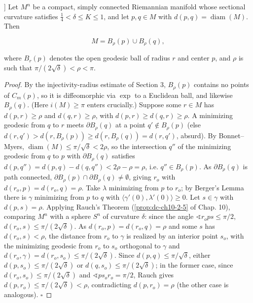 \begin{lemma}[covering by two balls; Tsukamoto [Ts]]
  \label{lem:dc-ch13-4-2}
  Let $M^n$ be a compact, simply connected Riemannian manifold whose sectional
  curvature satisfies $\tfrac14<\delta\leq K\leq 1$, and let $p,q\in M$ with
  $d(p,q)=\operatorname{diam}(M)$. Then
  
  $$
  M=B_\rho(p)\cup B_\rho(q),
  $$
  
  where $B_r(p)$ denotes the open geodesic ball of radius $r$ and center $p$, and
  $\rho$ is such that $\pi/(2\sqrt\delta)<\rho<\pi$.
\end{lemma}
\begin{proof}
  By the injectivity-radius estimate of Section 3, $B_\rho(p)$ contains no
  points of $C_m(p)$, so it is diffeomorphic via $\exp$ to a Euclidean ball, and
  likewise $B_\rho(q)$. (Here $i(M)\geq\pi$ enters crucially.) Suppose some $r\in M$
  has $d(p,r)\geq\rho$ and $d(q,r)\geq\rho$, with $d(p,r)\geq d(q,r)\geq\rho$. A
  minimizing geodesic from $q$ to $r$ meets $\partial B_\rho(q)$ at a point
  $q'\notin B_\rho(p)$ (else $d(r,q')>d(r,B_\rho(p))\geq d(r,B_\rho(q))=d(r,q')$,
  absurd). By Bonnet–Myers, $\operatorname{diam}(M)\leq\pi/\sqrt\delta<2\rho$, so the
  intersection $q''$ of the minimizing geodesic from $q$ to $p$ with $\partial B_\rho(q)$
  satisfies $d(p,q'')=d(p,q)-d(q,q'')<2\rho-\rho=\rho$, i.e. $q''\in B_\rho(p)$. As
  $\partial B_\rho(q)$ is path connected, $\partial B_\rho(p)\cap\partial B_\rho(q)\neq\emptyset$,
  giving $r_o$ with $d(r_o,p)=d(r_o,q)=\rho$. Take $\lambda$ minimizing from $p$ to
  $r_o$; by Berger's Lemma there is $\gamma$ minimizing from $p$ to $q$ with
  $\langle\gamma'(0),\lambda'(0)\rangle\geq0$. Let $s\in\gamma$ with $d(p,s)=\rho$.
  Applying Rauch's Theorem (\cref{prop:dc-ch10-2-5} of Chap. 10), comparing $M^n$ with a
  sphere $S^n$ of curvature $\delta$: since the angle
  $\sphericalangle r_o p s\leq\pi/2$, $d(r_o,s)\leq\pi/(2\sqrt\delta)$. As
  $d(r_o,p)=d(r_o,q)=\rho$ and some $s$ has $d(r_o,s)<\rho$, the distance from $r_o$ to
  $\gamma$ is realized by an interior point $s_o$, with the minimizing geodesic from
  $r_o$ to $s_o$ orthogonal to $\gamma$ and
  $d(r_o,\gamma)=d(r_o,s_o)\leq\pi/(2\sqrt\delta)$. Since $d(p,q)\leq\pi/\sqrt\delta$,
  either $d(p,s_o)\leq\pi/(2\sqrt\delta)$ or $d(q,s_o)\leq\pi/(2\sqrt\delta)$; in the
  former case, since $d(r_o,s_o)\leq\pi/(2\sqrt\delta)$ and
  $\sphericalangle p s_o r_o=\pi/2$, Rauch gives $d(p,r_o)\leq\pi/(2\sqrt\delta)<\rho$,
  contradicting $d(p,r_o)=\rho$ (the other case is analogous). $\square$
\end{proof}


